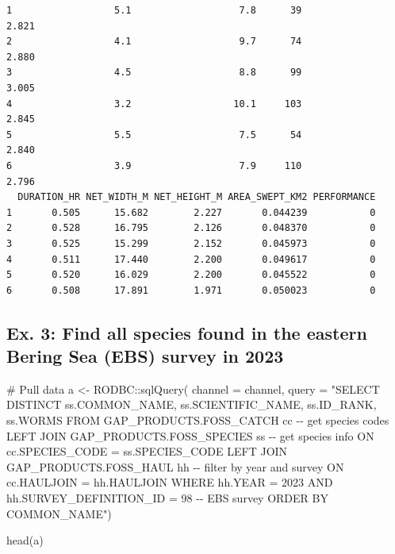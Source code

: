 \documentclass[
  letterpaper,
  oneside,
  open=any]{scrbook}
\newenvironment{Shaded}{\begin{snugshade}}{\end{snugshade}}
\newcommand{\AttributeTok}[1]{\textcolor[rgb]{0.40,0.45,0.13}{#1}}
\newcommand{\CommentTok}[1]{\textcolor[rgb]{0.37,0.37,0.37}{#1}}
\newcommand{\FunctionTok}[1]{\textcolor[rgb]{0.28,0.35,0.67}{#1}}
\newcommand{\NormalTok}[1]{\textcolor[rgb]{0.00,0.23,0.31}{#1}}
\newcommand{\OtherTok}[1]{\textcolor[rgb]{0.00,0.23,0.31}{#1}}
\newcommand{\SpecialCharTok}[1]{\textcolor[rgb]{0.37,0.37,0.37}{#1}}
\newcommand{\StringTok}[1]{\textcolor[rgb]{0.13,0.47,0.30}{#1}}
\begin{document}
\begin{verbatim}
1                  5.1                   7.8      39              2.821
2                  4.1                   9.7      74              2.880
3                  4.5                   8.8      99              3.005
4                  3.2                  10.1     103              2.845
5                  5.5                   7.5      54              2.840
6                  3.9                   7.9     110              2.796
  DURATION_HR NET_WIDTH_M NET_HEIGHT_M AREA_SWEPT_KM2 PERFORMANCE
1       0.505      15.682        2.227       0.044239           0
2       0.528      16.795        2.126       0.048370           0
3       0.525      15.299        2.152       0.045973           0
4       0.511      17.440        2.200       0.049617           0
5       0.520      16.029        2.200       0.045522           0
6       0.508      17.891        1.971       0.050023           0
\end{verbatim}

\hypertarget{ex.-3-find-all-species-found-in-the-eastern-bering-sea-ebs-survey-in-2023}{%
\subsection{Ex. 3: Find all species found in the eastern Bering Sea
(EBS) survey in
2023}\label{ex.-3-find-all-species-found-in-the-eastern-bering-sea-ebs-survey-in-2023}}

\begin{Shaded}
\begin{Highlighting}[]
\CommentTok{\# Pull data}
\NormalTok{a }\OtherTok{\textless{}{-}}\NormalTok{ RODBC}\SpecialCharTok{::}\FunctionTok{sqlQuery}\NormalTok{(}
\AttributeTok{channel =}\NormalTok{ channel, }
\AttributeTok{query =} 
\StringTok{"SELECT DISTINCT }
\StringTok{ss.COMMON\_NAME,}
\StringTok{ss.SCIENTIFIC\_NAME, }
\StringTok{ss.ID\_RANK, }
\StringTok{ss.WORMS}
\StringTok{FROM GAP\_PRODUCTS.FOSS\_CATCH cc {-}{-} get species codes}
\StringTok{LEFT JOIN GAP\_PRODUCTS.FOSS\_SPECIES ss {-}{-} get species info}
\StringTok{ON cc.SPECIES\_CODE = ss.SPECIES\_CODE}
\StringTok{LEFT JOIN GAP\_PRODUCTS.FOSS\_HAUL hh {-}{-} filter by year and survey}
\StringTok{ON cc.HAULJOIN = hh.HAULJOIN}
\StringTok{WHERE hh.YEAR = 2023}
\StringTok{AND hh.SURVEY\_DEFINITION\_ID = 98 {-}{-} EBS survey}
\StringTok{ORDER BY COMMON\_NAME"}\NormalTok{)}

\FunctionTok{head}\NormalTok{(a)}
\end{Highlighting}
\end{Shaded}
\end{document}
